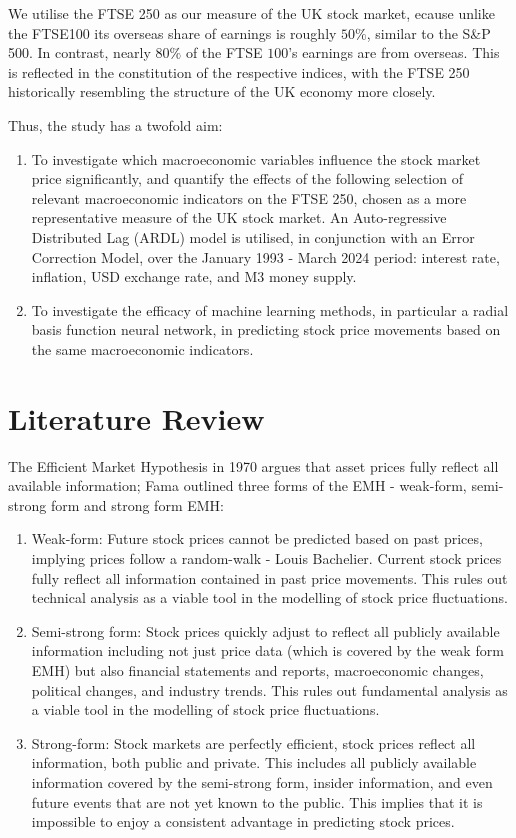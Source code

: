 \documentclass[12pt,a4paper]{article}
\begin{document}
We utilise the FTSE 250 as our measure of the UK stock market, ecause unlike the 
FTSE100 its overseas share of earnings is 
roughly $50\%$, similar to the S\&P 500. In contrast, nearly $80\%$ of the FTSE $100$'s earnings 
are from overseas. This is reflected in the constitution of the respective indices, with 
the FTSE 250 historically resembling the structure 
of the UK economy more closely. 

Thus, the study has a twofold aim:
\begin{enumerate}
    \item To investigate which macroeconomic variables influence the stock market price significantly, and quantify the effects of the following selection of relevant macroeconomic indicators on the FTSE 250, chosen as a more representative measure of the UK stock market. An Auto-regressive Distributed Lag (ARDL) model is utilised, in conjunction with an Error Correction Model, over the January 1993 - March 2024 period: interest rate, inflation, USD exchange rate, and M3 money supply. 
    \item To investigate the efficacy of machine learning methods, in particular a radial basis function neural network, in predicting stock price movements based on the same macroeconomic indicators. 
\end{enumerate}


\section{Literature Review}

The Efficient Market Hypothesis in 1970 \cite{fama1970} argues that asset prices fully 
reflect all available information; Fama outlined three forms of the EMH - 
weak-form, semi-strong form and strong form EMH:
\begin{enumerate}
    \item Weak-form: Future stock prices cannot be predicted based on past prices, implying prices follow a random-walk - Louis Bachelier. Current stock prices fully reflect all information contained in past price movements. This rules out technical analysis as a viable tool in the modelling of stock price fluctuations.
    \item Semi-strong form: Stock prices quickly adjust to reflect all publicly available information including not just price data (which is covered by the weak form EMH)  but also financial statements and reports, macroeconomic changes, political changes, and industry trends. This rules out fundamental analysis as a viable tool in the modelling of stock price fluctuations.
    \item Strong-form: Stock markets are perfectly efficient, stock prices reflect all information, both public and private. This includes all publicly available information covered by the semi-strong form, insider information, and even future events that are not yet known to the public. This implies that it is impossible to enjoy a consistent advantage in predicting stock prices.
\end{enumerate}
\end{document}
